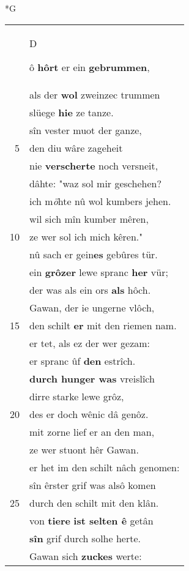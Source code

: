 \documentclass[8pt,a4paper,notitlepage]{article}
\begin{document}
\begin{table}[ht]
\begin{minipage}[t]{0.5\linewidth}
\small
\begin{center}*G
\end{center}
\begin{tabular}{rl}
 & \begin{large}D\end{large}ô \textbf{hôrt} er ein \textbf{gebrummen},\\ 
 & als der \textbf{wol} zweinzec trummen\\ 
 & slüege \textbf{hie} ze tanze.\\ 
 & sîn vester muot der ganze,\\ 
5 & den diu wâre zageheit\\ 
 & nie \textbf{verscherte} noch versneit,\\ 
 & dâhte: "waz sol mir geschehen?\\ 
 & ich m\textit{ö}hte nû wol kumbers jehen.\\ 
 & wil sich mîn kumber mêren,\\ 
10 & ze wer sol ich mich kêren."\\ 
 & nû sach er gein\textbf{es} gebûres tür.\\ 
 & ein \textbf{grôzer} lewe spranc \textbf{her} vür;\\ 
 & der was als ein ors \textbf{als} hôch.\\ 
 & Gawan, der ie ungerne vlôch,\\ 
15 & den schilt \textbf{er} mit den riemen nam.\\ 
 & er tet, als ez der wer gezam:\\ 
 & er spranc ûf \textbf{den} estrîch.\\ 
 & \textbf{durch hunger was} vreislîch\\ 
 & dirre starke lewe grôz,\\ 
20 & des er doch wênic dâ genôz.\\ 
 & mit zorne lief er an den man,\\ 
 & ze wer stuont hêr Gawan.\\ 
 & er het im den schilt nâch genomen:\\ 
 & sîn êrster grif was alsô komen\\ 
25 & durch den schilt mit den klân.\\ 
 & von \textbf{tiere} \textbf{ist selten ê} getân\\ 
 & \textbf{sîn} grif durch solhe herte.\\ 
 & Gawan sich \textbf{zuckes} werte:\\ 

\end{tabular}
\end{minipage}
\end{table}
\end{document}
